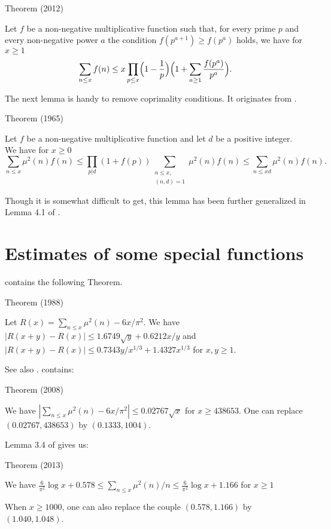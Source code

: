 \begin{thm}{Theorem (2012)}

Let $f$ be a non-negative multiplicative function such that, for every
prime $p$ and every non-negative power $a$ the condition
$f(p^{a+1})\ge f(p^a)$ holds, we have
for $x \ge 1$
$$
\sum_{n\le x}f(n)\le x\prod_{p\le x}
\Bigl(1-\frac{1}{p}\Bigr)\Bigl(
1+\sum_{a\ge 1}\frac{f(p^a)}{p^a}\Bigr).
$$
\end{thm}

  
The next lemma is handy to remove coprimality conditions.
It originates from
\cite{van-Lint-Richert*65}.

\begin{thm}{Theorem (1965)}

Let $f$ be a non-negative multiplicative function and let $d$ be a
positive integer. We have
for $x \ge 0$
$$
\sum_{n\le x}\mu^2(n)f(n)\le \prod_{p|d}(1+f(p))
\sum_{\substack{n\le x,\\ (n,d)=1}}\mu^2(n)f(n)
\le
\sum_{n\le xd}\mu^2(n)f(n).
$$
\end{thm}

Though it is somewhat difficult to get, this lemma has been further generalized in Lemma 4.1 of
\cite{Ramare*10}.

\section{Estimates of some special functions
}


\cite{Cohen-Dress*88} contains the
following Theorem.


\begin{thm}{Theorem (1988)}

  Let $R(x)=\sum_{n\le x}\mu^2(n)-6x/\pi^2$. We have
  $ |R(x+y)-R(x)|\le 1.6749\sqrt{y}+0.6212 x/y$ and 
  $ |R(x+y)-R(x)|\le 0.7343y/x^{1/3}+1.4327 x^{1/3}$ for $x,y\ge1$.
\end{thm}


See also \cite{CostaPereira*89}.
\cite{Cohen-Dress-ElMarraki*07}
contains:

\begin{thm}{Theorem (2008)}

  We have
  $ |\sum_{n\le x}\mu^2(n)-6x/\pi^2|\le 0.02767\sqrt{x}$ for $x\ge 438653$.
  One can replace $(0.02767, 438653)$ by $(0.1333, 1004)$.
\end{thm}




Lemma 3.4
of  \cite{Ramare*13d}
gives us:

\begin{thm}{Theorem (2013)}

We have
$\frac{6}{\pi^2}\log x+0.578\le \sum_{n\le x}\mu^2(n)/n\le \frac{6}{\pi^2}\log x+1.166$ for $x\ge1$

When $x\ge1000$, one can also replace the couple $(0.578, 1.166)$ by $(1.040, 1.048)$.
\end{thm}

